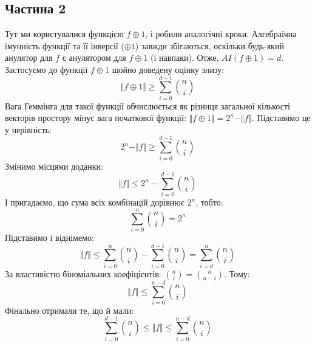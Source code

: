 \subsection*{Частина 2}
Тут ми користувалися функцією $f \oplus 1$, і робили аналогічні кроки. Алгебраїчна імунність функції та її 
інверсії ($\oplus 1$) завжди збігаються, оскільки будь-який анулятор для $f$ є анулятором для $f \oplus 1$ (і навпаки). 
Отже, $AI(f \oplus 1) = d$. Застосуємо до функції $f \oplus 1$ щойно доведену оцінку знизу:
\begin{equation*}
    \Vert f \oplus 1 \Vert \geq \sum\limits_{i=0}^{d-1} \binom{n}{i}
\end{equation*}
Вага Геммінга для такої функції обчислюється як різниця загальної кількості векторів простору мінус вага початкової 
функції: $\Vert f \oplus 1 \Vert = 2^{n} - \Vert f \Vert$. Підставимо це у нерівність:
\begin{equation*}
    2^{n} - \Vert f \Vert \geq \sum\limits_{i=0}^{d-1} \binom{n}{i}
\end{equation*}
Змінимо місцями доданки:
\begin{equation*}
    \Vert f \Vert \leq 2^{n} - \sum\limits_{i=0}^{d-1} \binom{n}{i}
\end{equation*}
І пригадаємо, що сума всіх комбінацій дорівнює $2^{n}$, тобто:
\begin{equation*}
    \sum\limits_{i=0}^{n} \binom{n}{i} = 2^{n}
\end{equation*}
Підставимо і віднімемо:
\begin{equation*}
    \Vert f \Vert \leq \sum\limits_{i=0}^{n} \binom{n}{i} - \sum\limits_{i=0}^{d-1} \binom{n}{i} = \sum\limits_{i=d}^{n} \binom{n}{i}
\end{equation*}
За властивістю біноміальних коефіцієнтів: $\binom{n}{i} = \binom{n}{n-i}$. Тому:
\begin{equation*}
    \Vert f \Vert \leq \sum\limits_{i=0}^{n-d} \binom{n}{i}
\end{equation*}
Фінально отримали те, що й мали:
\begin{equation*}
    \sum\limits_{i=0}^{d-1} \binom{n}{i} \leq \Vert f \Vert \leq \sum\limits_{i=0}^{n-d} \binom{n}{i}
\end{equation*}
